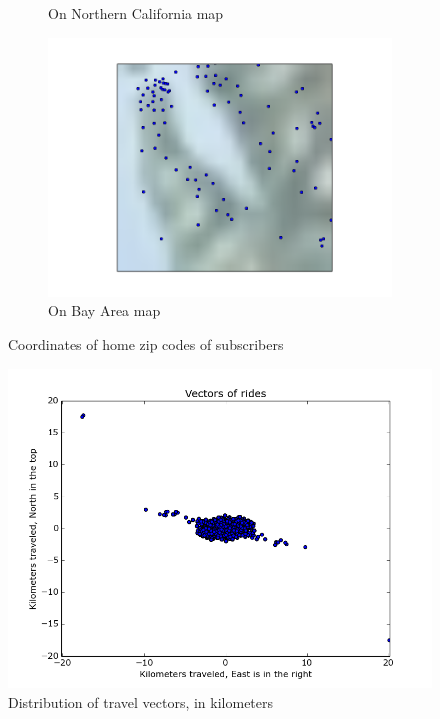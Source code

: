\documentclass{article}
\begin{document}
\begin{figure}
\begin{subfigure}[b]{0.4\textwidth}
                \caption{On Northern California map}
                \label{fig:homezips:norcal}
        \end{subfigure}
        \begin{subfigure}[b]{0.4\textwidth}
                \includegraphics[width=\textwidth]{../home_zips_bay_area.png}
                \caption{On Bay Area map}
                \label{fig:homezips:}
        \end{subfigure}
        \caption{Coordinates of home zip codes of subscribers}
        \label{fig:homezips}
\end{figure}

\begin{figure}
	\centering
	\includegraphics[width=\textwidth]{../travel_vector.png}
	\caption{Distribution of travel vectors, in kilometers}
	\label{fig:travelvector}
\end{figure}
\end{document}
